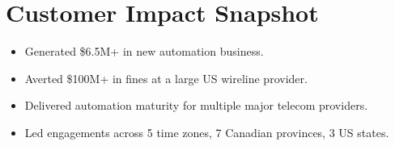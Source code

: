 \documentclass[11pt]{article}
\begin{document}
\section*{Customer Impact Snapshot}
\begin{itemize}[leftmargin=*]
    \item Generated \$6.5M+ in new automation business.
    \item Averted \$100M+ in fines at a large US wireline provider.
    \item Delivered automation maturity for multiple major telecom providers.
    \item Led engagements across 5 time zones, 7 Canadian provinces, 3 US states.
\end{itemize}
\end{document}
